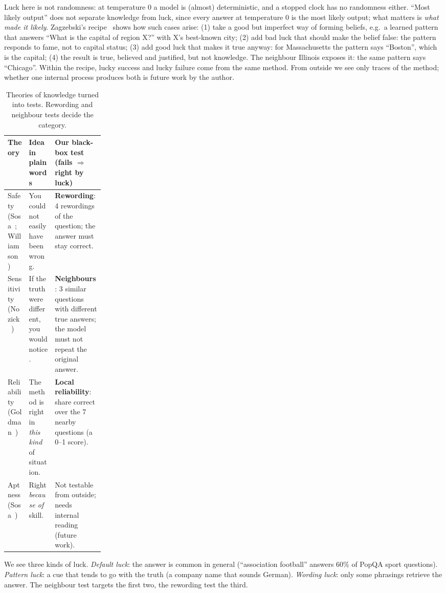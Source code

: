 \documentclass[10pt]{article}
\begin{document}
\smallskip
Luck here is not randomness: at temperature 0 a model is (almost) deterministic, and a stopped clock has no randomness either. ``Most likely output'' does not separate knowledge from luck, since every answer at temperature 0 is the most likely output; what matters is \emph{what made it likely}. Zagzebski's recipe~\cite{zagzebski} shows how such cases arise: (1) take a good but imperfect way of forming beliefs, e.g.\ a learned pattern that answers ``What is the capital of region X?'' with X's best-known city; (2) add bad luck that should make the belief false: the pattern responds to fame, not to capital status; (3) add good luck that makes it true anyway: for Massachusetts the pattern says ``Boston'', which is the capital; (4) the result is true, believed and justified, but not knowledge. The neighbour Illinois exposes it: the same pattern says ``Chicago''. Within the recipe, lucky success and lucky failure come from the same method. From outside we see only traces of the method; whether one internal process produces both is future work by the author.

\begin{table}[t]
\centering\small
\begin{tabularx}{\linewidth}{@{}p{0.22\linewidth} Y Y@{}}
\toprule
Theory & Idea in plain words & Our black-box test (fails $\Rightarrow$ right by luck) \\
\midrule
Safety (Sosa~\cite{sosa}; Williamson~\cite{williamson}) & You could not easily have been wrong. & \textbf{Rewording}: 4 rewordings of the question; the answer must stay correct. \\
Sensitivity (Nozick~\cite{nozick}) & If the truth were different, you would notice. & \textbf{Neighbours}: 3 similar questions with different true answers; the model must not repeat the original answer. \\
Reliability (Goldman~\cite{goldman}) & The method is right in \emph{this kind} of situation. & \textbf{Local reliability}: share correct over the 7 nearby questions (a 0--1 score). \\
Aptness (Sosa~\cite{sosa07}) & Right \emph{because of} skill. & Not testable from outside; needs internal reading (future work). \\
\bottomrule
\end{tabularx}
\caption{Theories of knowledge turned into tests. Rewording and neighbour tests decide the category.}
\label{tab:defs}
\end{table}

We see three kinds of luck. \emph{Default luck}: the answer is common in general (``association football'' answers 60\% of PopQA sport questions). \emph{Pattern luck}: a cue that tends to go with the truth (a company name that sounds German). \emph{Wording luck}: only some phrasings retrieve the answer. The neighbour test targets the first two, the rewording test the third.
\end{document}
